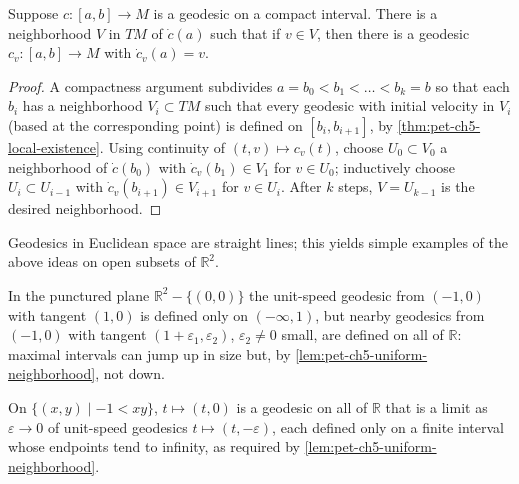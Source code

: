 \begin{lemma}
  \label{lem:pet-ch5-uniform-neighborhood}
  \leanok
  Suppose $c:[a,b]\to M$ is a geodesic on a compact interval. There is a
  neighborhood $V$ in $TM$ of $\dot c(a)$ such that if $v\in V$, then there is a
  geodesic $c_v:[a,b]\to M$ with $\dot c_v(a)=v$.
\end{lemma}
\begin{proof}
  A compactness argument subdivides $a=b_0<b_1<\dots<b_k=b$ so that each $b_i$ has a
  neighborhood $V_i\subset TM$ such that every geodesic with initial velocity in
  $V_i$ (based at the corresponding point) is defined on $[b_i,b_{i+1}]$, by
  \cref{thm:pet-ch5-local-existence}. Using continuity of $(t,v)\mapsto c_v(t)$,
  choose $U_0\subset V_0$ a neighborhood of $\dot c(b_0)$ with $\dot c_v(b_1)\in V_1$
  for $v\in U_0$; inductively choose $U_{i}\subset U_{i-1}$ with $\dot c_v(b_{i+1})\in
  V_{i+1}$ for $v\in U_i$. After $k$ steps, $V=U_{k-1}$ is the desired neighborhood.
\end{proof}

Geodesics in Euclidean space are straight lines; this yields simple examples of the
above ideas on open subsets of $\mathbb R^2$.

\begin{example}
  \label{ex:pet-ch5-punctured-plane-geodesic}
  In the punctured plane $\mathbb R^2-\{(0,0)\}$ the unit-speed geodesic from
  $(-1,0)$ with tangent $(1,0)$ is defined only on $(-\infty,1)$, but nearby
  geodesics from $(-1,0)$ with tangent $(1+\varepsilon_1,\varepsilon_2)$,
  $\varepsilon_2\ne0$ small, are defined on all of $\mathbb R$: maximal intervals can
  jump up in size but, by \cref{lem:pet-ch5-uniform-neighborhood}, not down.
\end{example}

\begin{example}
  \label{ex:pet-ch5-region-geodesic-jump}
  On $\{(x,y)\mid -1<xy\}$, $t\mapsto(t,0)$ is a geodesic on all of $\mathbb R$ that
  is a limit as $\varepsilon\to0$ of unit-speed geodesics $t\mapsto(t,-\varepsilon)$,
  each defined only on a finite interval whose endpoints tend to infinity, as
  required by \cref{lem:pet-ch5-uniform-neighborhood}.
\end{example}

